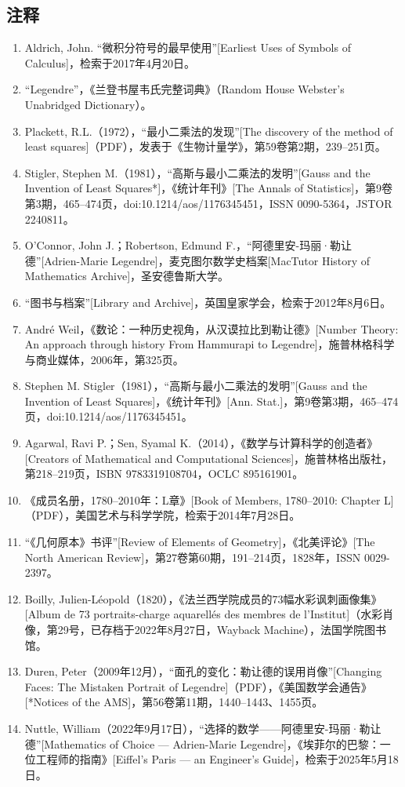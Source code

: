 \subsection{注释}
\begin{enumerate}
\item Aldrich, John. “微积分符号的最早使用”[Earliest Uses of Symbols of Calculus]，检索于2017年4月20日。
\item “Legendre”，《兰登书屋韦氏完整词典》（Random House Webster's Unabridged Dictionary）。
\item Plackett, R.L.（1972），“最小二乘法的发现”[The discovery of the method of least squares]（PDF），发表于《生物计量学》，第59卷第2期，239–251页。
\item Stigler, Stephen M.（1981），“高斯与最小二乘法的发明”[Gauss and the Invention of Least Squares*]，《统计年刊》[The Annals of Statistics]，第9卷第3期，465–474页，doi:10.1214/aos/1176345451，ISSN 0090-5364，JSTOR 2240811。
\item O'Connor, John J.；Robertson, Edmund F.，“阿德里安-玛丽·勒让德”[Adrien-Marie Legendre]，麦克图尔数学史档案[MacTutor History of Mathematics Archive]，圣安德鲁斯大学。
\item  “图书与档案”[Library and Archive]，英国皇家学会，检索于2012年8月6日。
\item  André Weil，《数论：一种历史视角，从汉谟拉比到勒让德》[Number Theory: An approach through history From Hammurapi to Legendre]，施普林格科学与商业媒体，2006年，第325页。
\item Stephen M. Stigler（1981），“高斯与最小二乘法的发明”[Gauss and the Invention of Least Squares]，《统计年刊》[Ann. Stat.]，第9卷第3期，465–474页，doi:10.1214/aos/1176345451。
\item Agarwal, Ravi P.；Sen, Syamal K.（2014），《数学与计算科学的创造者》[Creators of Mathematical and Computational Sciences]，施普林格出版社，第218–219页，ISBN 9783319108704，OCLC 895161901。
\item 《成员名册，1780–2010年：L章》[Book of Members, 1780–2010: Chapter L]（PDF），美国艺术与科学学院，检索于2014年7月28日。
\item “《几何原本》书评”[Review of Elements of Geometry]，《北美评论》[The North American Review]，第27卷第60期，191–214页，1828年，ISSN 0029-2397。
\item Boilly, Julien-Léopold（1820），《法兰西学院成员的73幅水彩讽刺画像集》[Album de 73 portraits-charge aquarellés des membres de l’Institut]（水彩肖像，第29号，已存档于2022年8月27日，Wayback Machine），法国学院图书馆。
\item Duren, Peter（2009年12月），“面孔的变化：勒让德的误用肖像”[Changing Faces: The Mistaken Portrait of Legendre]（PDF），《美国数学会通告》[*Notices of the AMS]，第56卷第11期，1440–1443、1455页。
\item Nuttle, William（2022年9月17日），“选择的数学——阿德里安-玛丽·勒让德”[Mathematics of Choice — Adrien-Marie Legendre]，《埃菲尔的巴黎：一位工程师的指南》[Eiffel’s Paris — an Engineer’s Guide]，检索于2025年5月18日。
\end{enumerate}
